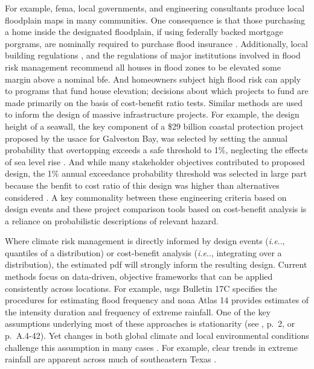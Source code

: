 \documentclass[11pt]{article}
\makeatletter
\DeclareRobustCommand\onedot{\futurelet\@let@token\@onedot}
\def\@onedot{\ifx\@let@token.\else.\null\fi\xspace}
\def\eg{\emph{e.g}\onedot} \def\Eg{\emph{E.g}\onedot}
\def\ie{\emph{i.e}\onedot} \def\Ie{\emph{I.e}\onedot}
\DeclareRobustCommand\onedot{\futurelet\@let@token\@onedot}
\def\@onedot{\ifx\@let@token.\else.\null\fi\xspace}
\def\eg{\emph{e.g}\onedot} \def\Eg{\emph{E.g}\onedot}
\def\ie{\emph{i.e}\onedot} \def\Ie{\emph{I.e}\onedot}
\makeatother
\begin{document}
For example, \gls{fema}, local governments, and engineering consultants produce local floodplain maps in many communities.
One consequence is that those purchasing a home inside the designated floodplain, if using federally backed mortgage porgrams, are nominally required to purchase flood insurance \citep{kousky_voucher:2014}.
Additionally, local building regulations \citep[based on guidance such as][]{asce_24-05:2006}, and the regulations of major institutions involved in flood risk management \citep[\eg,][]{FEMA_p-55:2011} recommend all houses in flood zones to be elevated some margin above a nominal \gls{bfe}.
And homeowners subject high flood risk can apply to programs that fund house elevation; decisions about which projects to fund are made primarily on the basis of cost-benefit ratio tests.
Similar methods are used to inform the design of massive infrastructure projects.
For example, the design height of a seawall, the key component of a \$29 billion coastal protection project proposed by the \gls{usace} for  Galveston Bay, was selected by setting the annual probability that overtopping exceeds a safe threshold to 1\%, neglecting the effects of sea level rise \citep[Appendix D.,~p.~2-59]{USACE_coastal:2021}.
And while many stakeholder objectives contributed to proposed design, the 1\% annual exceedance probability threshold was selected in large part because the benfit to cost ratio of this design was higher than alternatives considered \citep[\S 2.1.3]{USACE_coastal:2021}.
A key commonality between these engineering criteria based on design events and these project comparison tools based on cost-benefit analysis is a reliance on probabilistic descriptions of relevant hazard.

Where climate risk management is directly informed by design events (\ie, quantiles of a distribution) or cost-benefit analysis (\ie, integrating over a distribution), the estimated \gls{pdf} will strongly inform the resulting design.
Current methods focus on data-driven, objective frameworks that can be applied consistently across locations.
For example, \gls{usgs} Bulletin 17C specifies the procedures for estimating flood frequency and \gls{noaa} Atlas 14 provides estimates of the intensity duration and frequency of extreme rainfall.
One of the key assumptions underlying most of these approaches is stationarity (see \cite{bulletin17c:2019}, p.~2, or \cite{atlas14_texas:2018} p.~A.4-42).
Yet changes in both global climate and local environmental conditions challenge this assumption in many cases \citep{Merz:2014gf,Milly:2008dg}.
For example, clear trends in extreme rainfall are apparent across much of southeastern Texas \citep{fagnant_spatiotemporal:2020,nielsen-gammon_txrainfall:2020}.
\end{document}
